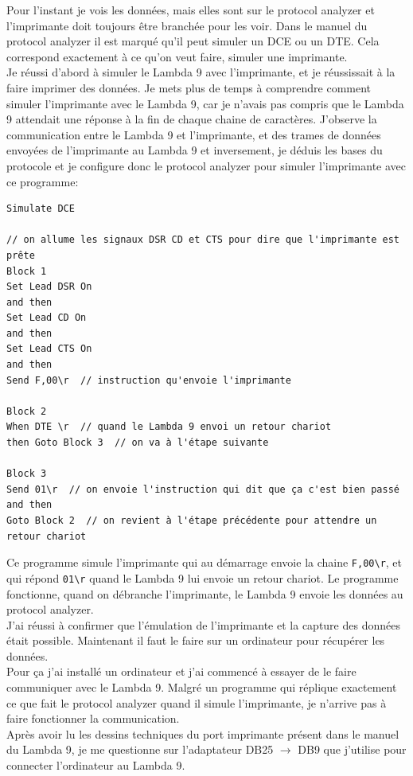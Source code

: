 \documentclass[12pt]{article}
\begin{document}
Pour l'instant je vois les données, mais elles sont sur le protocol analyzer et l'imprimante doit toujours être branchée pour les voir.
Dans le manuel du protocol analyzer il est marqué qu'il peut simuler un DCE ou un DTE.
Cela correspond exactement à ce qu'on veut faire, simuler une imprimante.\\
Je réussi d'abord à simuler le Lambda 9 avec l'imprimante, et je réussissait à la faire imprimer des données.
Je mets plus de temps à comprendre comment simuler l'imprimante avec le Lambda 9, car je n'avais pas compris que le Lambda 9 attendait une réponse à la fin de chaque chaine de caractères.
J'observe la communication entre le Lambda 9 et l'imprimante, et des trames de données envoyées de l'imprimante au Lambda 9 et inversement, je déduis les bases du protocole et je configure donc le protocol analyzer pour simuler l'imprimante avec ce programme:
\FloatBarrier
\begin{lstlisting}
Simulate DCE

// on allume les signaux DSR CD et CTS pour dire que l'imprimante est prête
Block 1
Set Lead DSR On
and then
Set Lead CD On
and then
Set Lead CTS On
and then
Send F,00\r  // instruction qu'envoie l'imprimante

Block 2
When DTE \r  // quand le Lambda 9 envoi un retour chariot
then Goto Block 3  // on va à l'étape suivante

Block 3
Send 01\r  // on envoie l'instruction qui dit que ça c'est bien passé
and then
Goto Block 2  // on revient à l'étape précédente pour attendre un retour chariot
\end{lstlisting}
Ce programme simule l'imprimante qui au démarrage envoie la chaine \verb|F,00\r|, et qui répond \verb|01\r| quand le Lambda 9 lui envoie un retour chariot.
Le programme fonctionne, quand on débranche l'imprimante, le Lambda 9 envoie les données au protocol analyzer.\\
J'ai réussi à confirmer que l'émulation de l'imprimante et la capture des données était possible.
Maintenant il faut le faire sur un ordinateur pour récupérer les données.\\
Pour ça j'ai installé un ordinateur et j'ai commencé à essayer de le faire communiquer avec le Lambda 9.
Malgré un programme qui réplique exactement ce que fait le protocol analyzer quand il simule l'imprimante, je n'arrive pas à faire fonctionner la communication.\\
Après avoir lu les dessins techniques du port imprimante présent dans le manuel du Lambda 9, je me questionne sur l'adaptateur DB25 $\rightarrow$ DB9 que j'utilise pour connecter l'ordinateur au Lambda 9.\\
\end{document}
